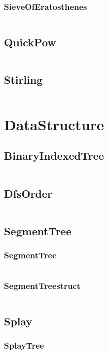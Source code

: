 \documentclass[a4paper,11pt]{article}
\begin{document}
\subsubsection{SieveOfEratosthenes}
\inputminted[breaklines]{c++}{Template/02++Math/+Prime/+SieveOfEratosthenes.cpp}

\subsection{QuickPow}
\inputminted[breaklines]{c++}{Template/02++Math/+QuickPow.cpp}
\subsection{Stirling}
\inputminted[breaklines]{c++}{Template/02++Math/+Stirling.cpp}

\newpage
\section{DataStructure}
\subsection{BinaryIndexedTree}
\inputminted[breaklines]{c++}{Template/03++DataStructure/+BinaryIndexedTree.cpp}
\subsection{DfsOrder}
\inputminted[breaklines]{c++}{Template/03++DataStructure/+DfsOrder.cpp}
\subsection{SegmentTree}
\subsubsection{SegmentTree}
\inputminted[breaklines]{c++}{Template/03++DataStructure/+SegmentTree/+SegmentTree.cpp}
\subsubsection{SegmentTreestruct}
\inputminted[breaklines]{c++}{Template/03++DataStructure/+SegmentTree/+SegmentTreestruct.cpp}

\subsection{Splay}
\subsubsection{SplayTree}
\inputminted[breaklines]{c++}{Template/03++DataStructure/+Splay/+SplayTree.cpp}
\end{document}
